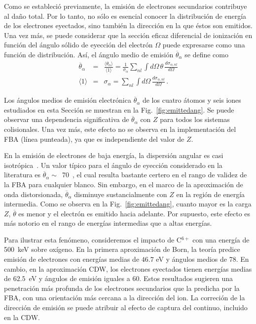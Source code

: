 Como se estableció previamente, la emisión de electrones secundarios 
contribuye al daño total. Por lo tanto, no sólo es esencial conocer la 
distribución de energía de los electrones eyectados, sino también la 
dirección en la que éstos son emitidos. Una vez más, se puede considerar 
que la sección eficaz diferencial de ionización en función del ángulo 
sólido de eyección del electrón $\Omega$ puede expresarse como una 
función de distribución. Así, el ángulo medio de emisión 
$\overline{\theta}_{\alpha}$ se define como 
\begin{eqnarray}
\overline{\theta}_{\alpha}&=&\frac{\langle\theta_{\alpha}\rangle}
{\langle 1\rangle}=\frac{1}{\sigma_{\alpha}}\sum\limits_{nl}
\int d\Omega\,\theta\,\frac{d\sigma_{\alpha,nl}}{d\Omega} 
\label{eq:meanang} \\
\langle 1\rangle &=&\sigma_{\alpha}=\sum\limits_{nl}\int d\Omega\,
\frac{d\sigma_{\alpha,nl}}{d\Omega}\,.
\end{eqnarray}

Los ángulos medios de emisión electrónica $\overline{\theta}_{\alpha}$ 
de los cuatro átomos y seis iones estudiados en esta Sección se muestran 
en la Fig.~\ref{fig:emittedang}. Se puede observar una dependencia 
significativa de $\overline{\theta}_{\alpha}$ con $Z$ para todos los 
sistemas colisionales. Una vez más, este efecto no se observa en la 
implementación del FBA (línea punteada), ya que es independiente del 
valor de $Z$.

En la emisión de electrones de baja energía, la dispersión angular es 
casi isotrópica~\cite{Rudd:92}. Un valor típico para el ángulo de 
eyección considerado en la literatura es 
$\overline{\theta}_{\alpha}\sim$~70\textdegree~\cite{Surdutovic:18}, el 
cual resulta bastante certero en el rango de validez de la FBA para 
cualquier blanco. Sin embargo, en el marco de la aproximación de onda 
distorsionada, $\overline{\theta}_{\alpha}$ disminuye sustancialmente 
con $Z$ en la región de energía intermedia. Como se observa en la 
Fig.~\ref{fig:emittedang}, cuanto mayor es la carga $Z$,
$\overline{\theta}$ es menor y el electrón es emitido hacia adelante. 
Por supuesto, este efecto es más notorio en el rango de energías 
intermedias que a altas energías.

Para ilustrar esta fenómeno, consideremos el impacto de C$^{6+}$ con una 
energía de 500~keV sobre oxígeno. En la primera aproximación de Born, la 
teoría predice emisión de electrones con energías medias de $46.7$ eV y 
ángulos medios de 78\textdegree. En cambio, en la aproximación CDW, los 
electrones eyectados tienen energías medias de $62.5$~eV y ángulos de 
emisión iguales a 60\textdegree. Estos resultados sugieren una 
penetración más profunda de los electrones secundarios que la predicha 
por la FBA, con una orientación más cercana a la dirección del ion. La 
correción de la dirección de emisión se puede atribuir al efecto de 
captura del continuo, incluido en la CDW.

